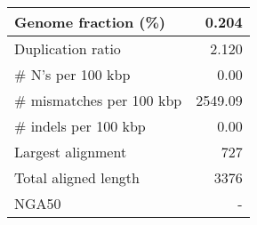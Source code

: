 \documentclass[12pt,a4paper]{article}
\begin{document}
\begin{table}[ht]
\begin{center}
\begin{tabular}{|l*{1}{|r}|}
Genome fraction (\%) & 0.204 \\ \hline
Duplication ratio & 2.120 \\ \hline
\# N's per 100 kbp & 0.00 \\ \hline
\# mismatches per 100 kbp & 2549.09 \\ \hline
\# indels per 100 kbp & 0.00 \\ \hline
Largest alignment & 727 \\ \hline
Total aligned length & 3376 \\ \hline
NGA50 & - \\ \hline
\end{tabular}
\end{center}
\end{table}
\end{document}
